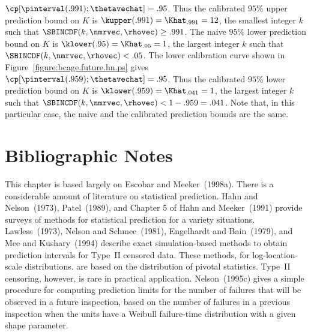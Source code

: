 \begin{example}
$\cp[\pinterval(.991);\thetavechat]=.95$.  Thus the calibrated
$95\%$ upper prediction bound on $K$ is $\kupper(.991)=\Khat_{.991}=12$, the
smallest integer $k$ such that $\SBINCDF(k,\nmrvec,\rhovec) \geq
.991$. 
The naive $95\%$ lower prediction bound on $K$
is $\klower(.95)=\Khat_{.05}=1$, the largest integer $k$
such that $\SBINCDF(k,\nmrvec,\rhovec) < .05$.
The lower calibration curve shown in
Figure~\ref{figure:bcage.future.hn.ps}
gives
$\cp[\pinterval(.959);\thetavechat]=.95$.
Thus the calibrated $95\%$ lower prediction
bound on $K$ is $\klower(.959)=\Khat_{.041}=1$, the largest
integer $k$ such that
$\SBINCDF(k,\nmrvec,\rhovec) < 1 - .959=.041$. Note
that, in this particular case, the naive and
the calibrated prediction bounds are the same.
\end{example}

\section*{Bibliographic Notes}
This chapter is based largely on Escobar and Meeker~(1998a).
There is a considerable amount of literature on statistical
prediction.  Hahn and Nelson~(1973), Patel~(1989), and Chapter 5 of
Hahn and Meeker~(1991) provide surveys of methods for statistical
prediction for a variety situations.  Lawless~(1973), Nelson and
Schmee~(1981), Engelhardt and Bain~(1979), and Mee and Kushary~(1994)
describe exact simulation-based methods to obtain prediction intervals for
Type~II censored data.  These methods, for log-location-scale
distributions.
are based on the distribution of
pivotal statistics.  Type~II censoring, however, is rare in practical
application. Nelson~(1995c) gives a simple procedure for computing
prediction limits for the number of failures that will be observed in
a future inspection, based on the number of failures in a previous
inspection when the units have a Weibull failure-time distribution
with a given shape parameter.

